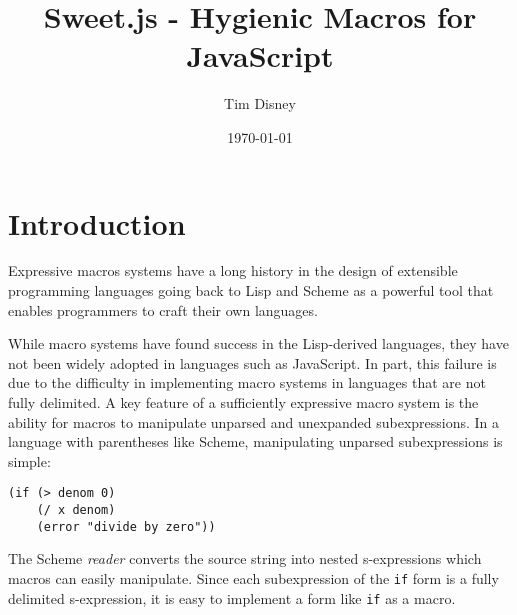 \documentclass[preprint,10pt]{sigplanconf}
\author{Tim Disney}
\date{\today}
\title{Sweet.js - Hygienic Macros for JavaScript}
\begin{document}

\lstset{
   language=JavaScript,
   extendedchars=true,
   basicstyle=\footnotesize\ttfamily,
   showstringspaces=false,
   showspaces=false,
   numberstyle=\footnotesize,
   numbersep=9pt,
   tabsize=2,
   breaklines=true,
   showtabs=false,
   captionpos=b
}


\maketitle


\section{Introduction}
\label{sec-1}

Expressive macros systems have a long history in the design of
extensible programming languages going back to Lisp and Scheme
\cite{Kohlbecker1987,Foderaro1983} as a powerful tool that enables
programmers to craft their own languages.

While macro systems have found success in the Lisp-derived languages,
they have not been widely adopted in languages such as JavaScript. In
part, this failure is due to the difficulty in implementing macro
systems in languages that are not fully delimited. A key feature of a
sufficiently expressive macro system is the ability for macros to
manipulate unparsed and unexpanded subexpressions. In a language with
parentheses like Scheme, manipulating unparsed subexpressions is
simple:
\begin{lstlisting}
(if (> denom 0)
    (/ x denom)
    (error "divide by zero"))
\end{lstlisting}
The Scheme \emph{reader} converts the source string into nested
s-expressions which macros can easily manipulate. Since each
subexpression of the \lstinline!if! form is a fully delimited
s-expression, it is easy to implement a form like \lstinline!if! as a
macro.
\end{document}
